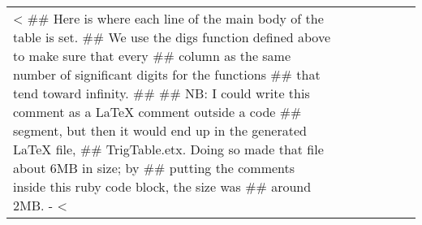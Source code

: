 \documentclass{article}
\begin{document}
\begin{longtable}[c]{l|llllll}
<%
## Here is where each line of the main body of the table is set.
## We use the digs function defined above to make sure that every
## column as the same number of significant digits for the functions
## that tend toward infinity.
##
## NB: I could write this comment as a LaTeX comment outside a code
## segment, but then it would end up in the generated LaTeX file,
## TrigTable.etx.  Doing so made that file about 6MB in size; by
## putting the comments inside this ruby code block, the size was 
## around 2MB.
-%
<%
\mark{<%
<%
<%
<%
<%
<%
<%
<%

<%
      x += step
    end 

<%
<%
<%
<%
<%
<%
<%

\end{longtable}
\end{document}
